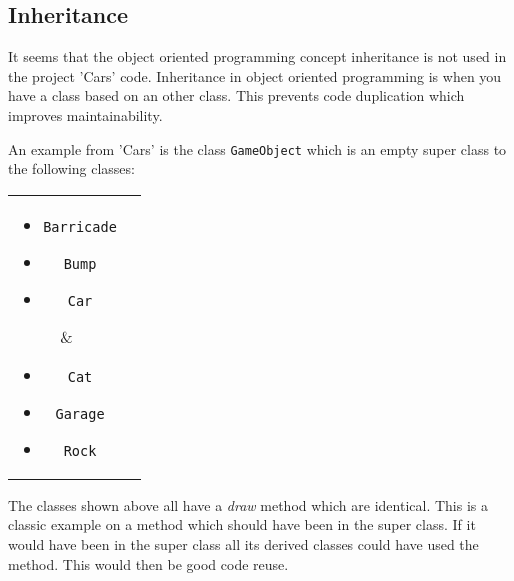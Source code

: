 \subsection{Inheritance}\label{sprint1_inheritance}
It seems that the object oriented programming concept inheritance is not used in the project 'Cars' code.
Inheritance in object oriented programming is when you have a class based on an other class.
This prevents code duplication which improves maintainability.

An example from 'Cars' is the class \lstinline!GameObject! which is an empty super class to the following classes:

\begin{tabular}{ c  c }
\parbox{\textwidth/2}{
\begin{itemize}
\item \lstinline!Barricade!
\item \lstinline!Bump!
\item \lstinline!Car!
\end{itemize}} &
\parbox{\textwidth/2}{
\begin{itemize}
\item \lstinline!Cat!
\item \lstinline!Garage!
\item \lstinline!Rock!
\end{itemize}
}
\end{tabular}
The classes shown above all have a \textit{draw} method which are identical.
This is a classic example on a method which should have been in the super class.
If it would have been in the super class all its derived classes could have used the method.
This would then be good code reuse.